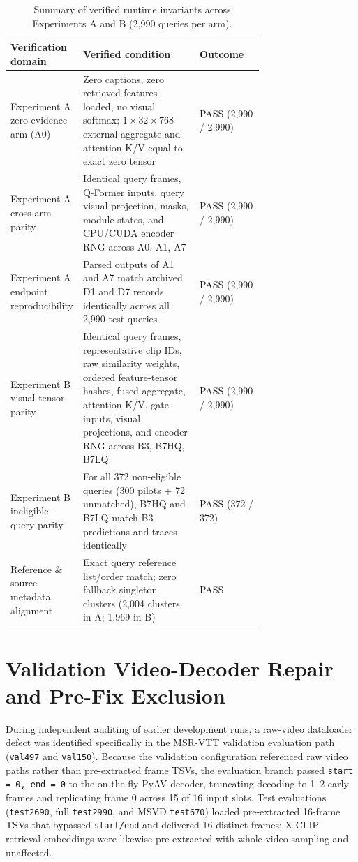 \documentclass[11pt,a4paper]{article}
\begin{document}
\begin{table}[t]
\centering
\small
\caption{Summary of verified runtime invariants across Experiments A and B (2,990 queries per arm).}
\label{tab:s6}
\begin{tabular}{p{0.26\linewidth}p{0.46\linewidth}l}
\toprule
\textbf{Verification domain} & \textbf{Verified condition} & \textbf{Outcome} \\
\midrule
Experiment A zero-evidence arm (A0) & Zero captions, zero retrieved features loaded, no visual softmax; $1 \times 32 \times 768$ external aggregate and attention K/V equal to exact zero tensor & PASS (2,990 / 2,990) \\
Experiment A cross-arm parity & Identical query frames, Q-Former inputs, query visual projection, masks, module states, and CPU/CUDA encoder RNG across A0, A1, A7 & PASS (2,990 / 2,990) \\
Experiment A endpoint reproducibility & Parsed outputs of A1 and A7 match archived D1 and D7 records identically across all 2,990 test queries & PASS (2,990 / 2,990) \\
Experiment B visual-tensor parity & Identical query frames, representative clip IDs, raw similarity weights, ordered feature-tensor hashes, fused aggregate, attention K/V, gate inputs, visual projections, and encoder RNG across B3, B7HQ, B7LQ & PASS (2,990 / 2,990) \\
Experiment B ineligible-query parity & For all 372 non-eligible queries (300 pilots + 72 unmatched), B7HQ and B7LQ match B3 predictions and traces identically & PASS (372 / 372) \\
Reference \& source metadata alignment & Exact query reference list/order match; zero fallback singleton clusters (2,004 clusters in A; 1,969 in B) & PASS \\
\bottomrule
\end{tabular}
\end{table}

\section{Validation Video-Decoder Repair and Pre-Fix Exclusion}
During independent auditing of earlier development runs, a raw-video dataloader defect was identified specifically in the MSR-VTT validation evaluation path (\texttt{val497} and \texttt{val150}). Because the validation configuration referenced raw video paths rather than pre-extracted frame TSVs, the evaluation branch passed \texttt{start = 0, end = 0} to the on-the-fly PyAV decoder, truncating decoding to 1--2 early frames and replicating frame 0 across 15 of 16 input slots. Test evaluations (\texttt{test2690}, full \texttt{test2990}, and MSVD \texttt{test670}) loaded pre-extracted 16-frame TSVs that bypassed \texttt{start/end} and delivered 16 distinct frames; X-CLIP retrieval embeddings were likewise pre-extracted with whole-video sampling and unaffected.
\end{document}
